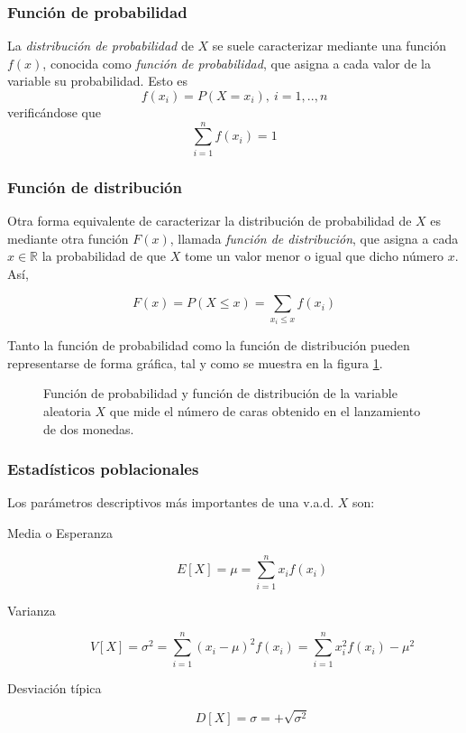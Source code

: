\subsubsection{Función de probabilidad}
La \emph{distribución de probabilidad} de $X$ se suele caracterizar mediante una función $f(x)$, conocida como \emph{función de probabilidad}, que asigna a cada valor de la variable su probabilidad. Esto es
\[f(x_i)=P(X=x_i),\ i=1,..,n\]
verificándose que
\[\sum_{i=1}^{n} f(x_i)=1\]

\subsubsection{Función de distribución}
Otra forma equivalente de caracterizar la distribución de probabilidad de $X$ es mediante otra función $F(x)$, llamada \emph{función de distribución}, que asigna a cada $x\in \mathbb{R}$ la probabilidad de que $X$ tome un valor menor o igual que dicho número $x$. Así,

\[
F(x) = P(X \le x) = \sum\limits_{x_i  \le x} {f(x_i)}
\]

Tanto la función de probabilidad como la función de distribución pueden representarse de forma gráfica, tal y como se muestra en la figura \ref{g:graficasvad}.

\begin{figure}[h!]
\centering {}\qquad
{}
\caption{Función de probabilidad y función de distribución de la variable aleatoria $X$ que mide el número de caras obtenido en el lanzamiento de dos monedas.} \label{g:graficasvad}
\end{figure}

\subsubsection{Estadísticos poblacionales}
Los parámetros descriptivos más importantes de una v.a.d. $X$ son:
\begin{description}
\item [Media o Esperanza]
\[
E[X]=\mu  = \sum\limits_{i = 1}^n {x_i f(x_i )}
\]

\item [Varianza]
\[
V[X]=\sigma ^2  = \sum\limits_{i = 1}^n {(x_i  - \mu )^2 f(x_i ) = }
\sum\limits_{i = 1}^n {x_i ^2 f(x_i ) - \mu ^2 }
\]

\item [Desviación típica]
\[
D[X]=\sigma  =  + \sqrt {\sigma ^2 }
\]
\end{description}

